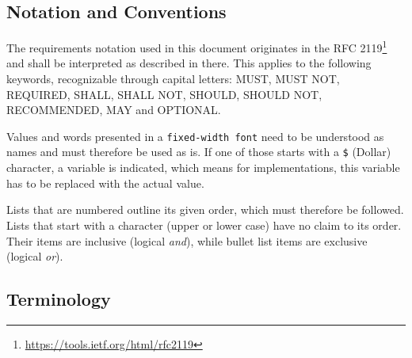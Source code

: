 \documentclass[12pt,english,a4paper,titlepage,cleardoublepage=empty,dottedtoc]{report}
\renewcommand{\href}[2]{#2\footnote{\url{#1}}}
\begin{document}
\subsection*{Notation and Conventions}\label{notation-and-conventions}

The requirements notation used in this document originates in the
\href{https://tools.ietf.org/html/rfc2119}{RFC 2119} and shall be
interpreted as described in there. This applies to the following
keywords, recognizable through capital letters: MUST, MUST NOT,
REQUIRED, SHALL, SHALL NOT, SHOULD, SHOULD NOT, RECOMMENDED, MAY and
OPTIONAL.

Values and words presented in a \texttt{fixed-width\ font} need to be
understood as names and must therefore be used as is. If one of those
starts with a \texttt{\$} (Dollar) character, a variable is indicated,
which means for implementations, this variable has to be replaced with
the actual value.

Lists that are numbered outline its given order, which must therefore be
followed. Lists that start with a character (upper or lower case) have
no claim to its order. Their items are inclusive (logical \emph{and}),
while bullet list items are exclusive (logical \emph{or}).

\subsection*{Terminology}\label{terminology}
\end{document}
